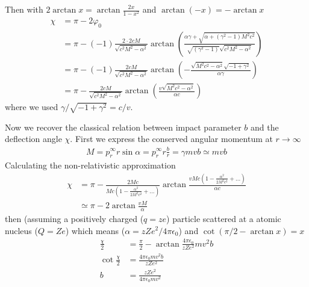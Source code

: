 \documentclass[../main.tex]{subfiles}
\begin{document}
Then with $2\arctan x =\arctan\frac{2x}{1-x^2}$ and $\arctan(-x)=-\arctan x$
\begin{align}
\chi&=\pi-2\varphi_0\\
&=\pi-(-1)\frac{2\cdot2 c M}{\sqrt{c^2 M^2-\alpha ^2}} \arctan\left(\frac{\alpha  \gamma + \sqrt{\alpha
+\left(\gamma ^2-1\right) M^2c^2}}{\sqrt{ \left(\gamma^2-1\right)} \sqrt{c^2 M^2-\alpha ^2}}\right)\\
&=\pi-(-1)\frac{2 c M}{\sqrt{c^2 M^2-\alpha ^2}} \arctan\left(-\frac{\sqrt{M^2c^2-\alpha^2}\sqrt{-1+\gamma^2}}{\alpha\gamma}\right)\\
&=\pi-\frac{2 c M}{\sqrt{c^2 M^2-\alpha ^2}} \arctan\left(\frac{v\sqrt{M^2c^2-\alpha^2}}{\alpha c}\right)
\end{align}
where we used $\gamma/\sqrt{-1+\gamma^2}=c/v$.

Now we recover the classical relation between impact parameter $b$ and the deflection angle $\chi$. First we express the conserved angular momentum at $r\rightarrow\infty$
\begin{align}
M=p_r^\infty r \sin\alpha=p_r^\infty r\frac{b}{r}=\gamma m vb\simeq mvb
\end{align}
Calculating the non-relativistic approximation
\begin{align}
\chi
&=\pi-\frac{2Mc}{Mc\left(1-\frac{\alpha^2}{2M^2c^2}+...\right)}\arctan\frac{vMc\left(1-\frac{\alpha^2}{2M^2c^2}+...\right)}{\alpha c}\\
&\simeq\pi-2\arctan\frac{vM}{\alpha}
\end{align}
then (assuming a positively charged ($q=ze$) particle scattered at a atomic nucleus ($Q=Ze$) which means ($\alpha=zZe^2/4\pi\epsilon_0$) and $\cot\left(\pi/2-\arctan x\right)=x$
\begin{align}
\frac{\chi}{2}&=\frac{\pi}{2}-\arctan \frac{4\pi\epsilon_0}{zZe^2}mv^2b\\
\cot\frac{\chi}{2}&=\frac{4\pi\epsilon_0mv^2b}{zZe^2}\\
b&=\frac{zZe^2}{4\pi\epsilon_0mv^2}
\end{align}
\end{document}
